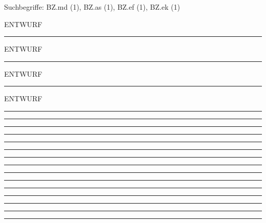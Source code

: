 \documentclass[a4paper,12pt]{report}
\begin{document}

 \scriptsize Suchbegriffe: BZ.md (1), BZ.as (1), BZ.ef (1), BZ.ek (1)\normalsize 
 
ENTWURF %
\hrule	 \leer

ENTWURF %
\hrule	 \leer

ENTWURF %
\hrule	 \leer

ENTWURF %
\hrule	 \leer

%
\hrule	 \leer

%
\hrule	 \leer

%
\hrule	 \leer

%
\hrule	 \leer

%
\hrule	 \leer

%
\hrule	 \leer

%
\hrule	 \leer

%
\hrule	 \leer

%
\hrule	 \leer

%
\hrule	 \leer

%
\hrule	 \leer

%
\hrule	 \leer

%
\hrule	 \leer

%
\hrule	 \leer

\end{document}
